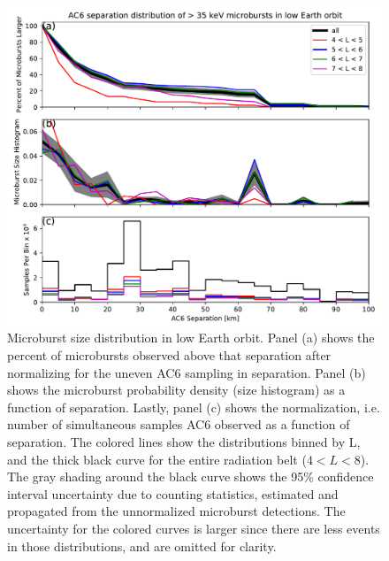 \documentclass[draft]{agujournal2019}
\begin{document}
\begin{figure}
\includegraphics[width=\textwidth]{fig3.pdf}
\caption{Microburst size distribution in low Earth orbit. Panel (a) shows the percent of microbursts observed above that separation after normalizing for the uneven AC6 sampling in separation. Panel (b) shows the microburst probability density (size histogram) as a function of separation. Lastly, panel (c) shows the normalization, i.e. number of simultaneous samples AC6 observed as a function of separation. The colored lines show the distributions binned by L, and the thick black curve for the entire radiation belt ($4 < L < 8$). The gray shading around the black curve shows the 95\% confidence interval uncertainty due to counting statistics, estimated and propagated from the unnormalized microburst detections. The uncertainty for the colored curves is larger since there are less events in those distributions, and are omitted for clarity.}
\label{fig3}
\end{figure}
\end{document}
